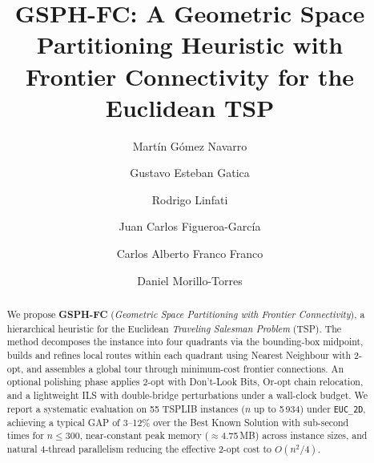 \documentclass[runningheads]{llncs}
\begin{document}
\title{GSPH-FC: A Geometric Space Partitioning Heuristic
with Frontier Connectivity for the Euclidean TSP}

\author{%
  Martín Gómez Navarro \and
  Gustavo Esteban Gatica \and
  Rodrigo Linfati \and
  Juan Carlos Figueroa-García \and
  Carlos Alberto Franco Franco \and
  Daniel Morillo-Torres}

\maketitle

\begin{abstract}
We propose \textbf{GSPH-FC} (\textit{Geometric Space Partitioning
with Frontier Connectivity}), a hierarchical heuristic for the
Euclidean \textit{Traveling Salesman Problem} (TSP). The method
decomposes the instance into four quadrants via the bounding-box
midpoint, builds and refines local routes within each quadrant
using Nearest Neighbour with 2-opt, and assembles a global tour
through minimum-cost frontier connections. An optional polishing
phase applies 2-opt with Don't-Look Bits, Or-opt chain relocation,
and a lightweight ILS with double-bridge perturbations under a
wall-clock budget. We report a systematic evaluation on 55 TSPLIB
instances ($n$ up to 5\,934) under \texttt{EUC\_2D}, achieving a
typical GAP of 3--12\% over the Best Known Solution with sub-second
times for $n\!\le\!300$, near-constant peak memory ($\approx$4.75\,MB)
across instance sizes, and natural 4-thread parallelism reducing the
effective 2-opt cost to $O(n^2/4)$.
\end{abstract}
\end{document}
